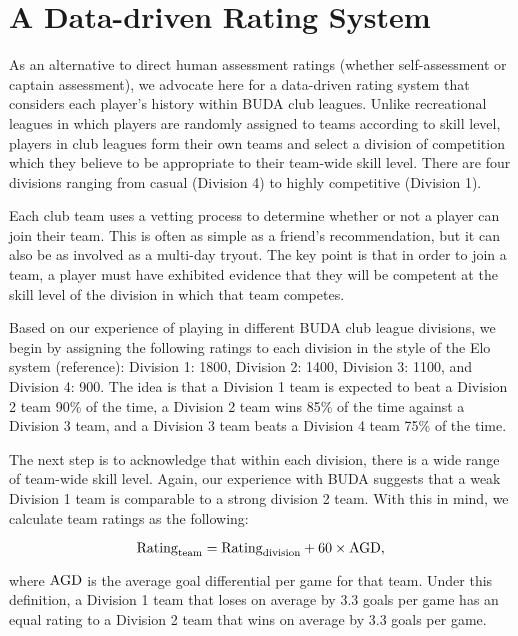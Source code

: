 \section{A Data-driven Rating System}\label{sec:club_rating}

As an alternative to direct human assessment ratings (whether self-assessment or captain assessment), we advocate here for a data-driven rating system that considers each player's history within BUDA club leagues. Unlike recreational leagues in which players are randomly assigned to teams according to skill level, players in club leagues form their own teams and select a division of competition which they believe to be appropriate to their team-wide skill level.  There are four divisions ranging from casual (Division 4) to highly competitive (Division 1).

Each club team uses a vetting process to determine whether or not a player can join their team. This is often as simple as a friend's recommendation, but it can also be as involved as a multi-day tryout. The key point is that in order to join a team, a player must have exhibited evidence that they will be competent at the skill level of the division in which that team competes.

Based on our experience of playing in different BUDA club league divisions, we begin by assigning the following ratings to each division in the style of the Elo system (reference): Division 1: 1800, Division 2: 1400, Division 3: 1100, and Division 4: 900.  The idea is that a Division 1 team is expected to beat a Division 2 team 90\% of the time, a Division 2 team wins 85\% of the time against a Division 3 team, and a Division 3 team beats a Division 4 team 75\% of the time.

The next step is to acknowledge that within each division, there is a wide range of team-wide skill level. Again, our experience with BUDA suggests that a weak Division 1 team is comparable to a strong division 2 team.  With this in mind, we calculate team ratings as the following:

\begin{equation}
{\rm Rating}_{\rm team} = {\rm Rating}_{\rm division} + 60 \times {\rm AGD},
\end{equation}

\noindent where ${\rm AGD}$ is the average goal differential per game for that team.  Under this definition, a Division 1 team that loses on average by 3.3 goals per game has an equal rating to a Division 2 team that wins on average by 3.3 goals per game.

